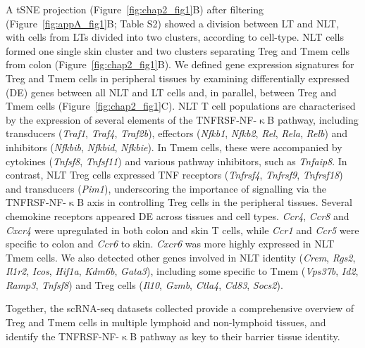 A tSNE projection (Figure~\ref{fig:chap2_fig1}B) after filtering (Figure~\ref{fig:appA_fig1}B; Table S2) showed a division between LT and NLT, with cells from LTs divided into two clusters, according to cell-type. NLT cells formed one single skin cluster and two clusters separating Treg and Tmem cells from colon (Figure~\ref{fig:chap2_fig1}B). We defined gene expression signatures for Treg and Tmem cells in peripheral tissues by examining differentially expressed (DE) genes between all NLT and LT cells and, in parallel, between Treg and Tmem cells (Figure~\ref{fig:chap2_fig1}C). NLT T cell populations are characterised by the expression of several elements of the TNFRSF-NF-${\upkappa}$B pathway, including transducers (\textit{Traf1}, \textit{Traf4}, \textit{Traf2b}), effectors (\textit{Nfkb1}, \textit{Nfkb2}, \textit{Rel}, \textit{Rela}, \textit{Relb}) and inhibitors (\textit{Nfkbib}, \textit{Nfkbid}, \textit{Nfkbie}). In Tmem cells, these were accompanied by cytokines (\textit{Tnfsf8}, \textit{Tnfsf11}) and various pathway inhibitors, such as \textit{Tnfaip8}. In contrast, NLT Treg cells expressed TNF receptors (\textit{Tnfrsf4}, \textit{Tnfrsf9}, \textit{Tnfrsf18}) and transducers (\textit{Pim1}), underscoring the importance of signalling via the TNFRSF-NF-${\upkappa}$B axis in controlling Treg cells in the peripheral tissues. Several chemokine receptors appeared DE across tissues and cell types. \textit{Ccr4}, \textit{Ccr8} and \textit{Cxcr4} were upregulated in both colon and skin T cells, while \textit{Ccr1} and \textit{Ccr5} were specific to colon and \textit{Ccr6} to skin. \textit{Cxcr6} was more highly expressed in NLT Tmem cells. We also detected other genes involved in NLT identity (\textit{Crem}, \textit{Rgs2}, \textit{Il1r2}, \textit{Icos}, \textit{Hif1a}, \textit{Kdm6b}, \textit{Gata3}), including some specific to Tmem (\textit{Vps37b}, \textit{Id2}, \textit{Ramp3}, \textit{Tnfsf8}) and Treg cells (\textit{Il10}, \textit{Gzmb}, \textit{Ctla4}, \textit{Cd83}, \textit{Socs2}).

Together, the scRNA-seq datasets collected provide a comprehensive overview of Treg and Tmem cells in multiple lymphoid and non-lymphoid tissues, and identify the TNFRSF-NF-${\upkappa}$B pathway as key to their barrier tissue identity.


